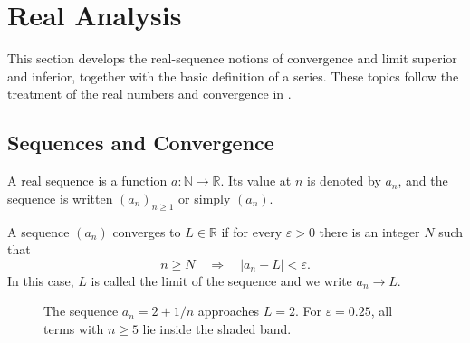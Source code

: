 \section{Real Analysis}

This section develops the real-sequence notions of convergence and limit superior and inferior, together with the basic definition of a series. These topics follow the treatment of the real numbers and convergence in \cite[Chapter 1, Sections 1.8 and 1.16]{Berberian1998-qc}.

\subsection{Sequences and Convergence}

\begin{definition}[Sequence]
A real sequence is a function $a:\mathbb{N}\to\mathbb{R}$. Its value at $n$ is denoted by $a_n$, and the sequence is written $(a_n)_{n\geq 1}$ or simply $(a_n)$.
\end{definition}

\begin{definition}[Convergence]
A sequence $(a_n)$ converges to $L\in\mathbb{R}$ if for every $\varepsilon>0$ there is an integer $N$ such that
\[
 n\geq N\quad\Longrightarrow\quad |a_n-L|<\varepsilon.
\]
In this case, $L$ is called the limit of the sequence and we write $a_n\to L$.
\end{definition}

\begin{figure}[htbp]
\centering
{}
\caption{The sequence $a_n=2+1/n$ approaches $L=2$. For $\varepsilon=0.25$, all terms with $n\geq5$ lie inside the shaded band.}
\label{fig:sequence-convergence}
\end{figure}

